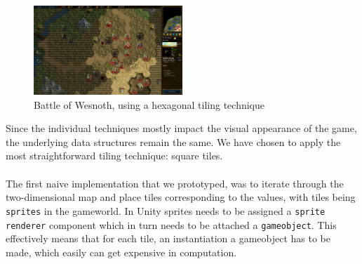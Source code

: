 \begin{figure}[H]
    \centering
    \includegraphics[width=0.5\textwidth]{figures/generating_levels/wesnoth_hex.png}
    \caption{Battle of Wesnoth, using a hexagonal tiling technique}\label{fig:wesnoth_hex}
\end{figure}
Since the individual techniques mostly impact the visual appearance of the game, the underlying data structures remain the same.
We have chosen to apply the most straightforward tiling technique: square tiles.
\\
\\
The first naive implementation that we prototyped, was to iterate through the two-dimensional map and place tiles corresponding to the values, with tiles being \texttt{sprites} in the gameworld.
In Unity sprites needs to be assigned a \texttt{sprite renderer} component which in turn needs to be attached a \texttt{gameobject}.
This effectively means that for each tile, an instantiation a gameobject has to be made, which easily can get expensive in computation.

